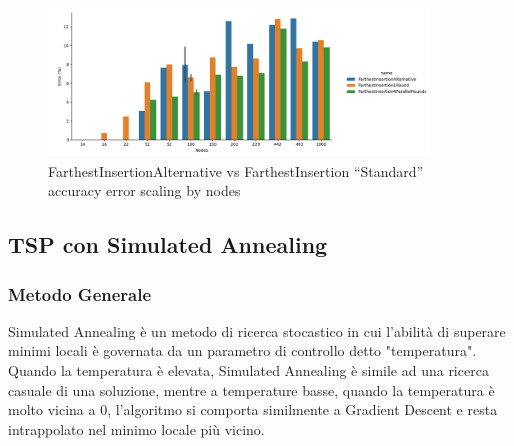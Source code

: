\begin{figure}[!ht]
    \centering

    \includegraphics[width=0.9\textwidth]{./images/FarthestInsertionAlternative_vs_FarthestInsertion1Round_vs_FarthestInsertion4ParallelRounds__approximation_error_.png}

    \caption{FarthestInsertionAlternative vs FarthestInsertion ``Standard'' accuracy error scaling by nodes}
    \label{fig:farthest-insertion-alt-vs-std-1-4-rounds-accuracy-error}
\end{figure}

\subsection{TSP con Simulated Annealing}

\subsubsection{Metodo Generale}


\noindent Simulated Annealing è un metodo di ricerca stocastico in cui l'abilità di superare minimi locali è governata da un parametro di controllo detto "temperatura". Quando la temperatura è elevata, Simulated Annealing è simile ad una ricerca casuale di una soluzione, mentre a temperature basse, quando la temperatura è molto vicina a 0, l'algoritmo si comporta similmente a Gradient Descent e resta intrappolato nel minimo locale più vicino. \\

